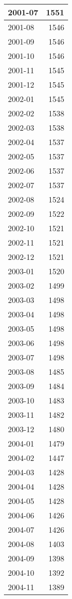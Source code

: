 \documentclass[
]{article}
\begin{document}
\begin{table}[H]
\begin{tabular}{l|r}
\hline
2001-07 & 1551\\
\hline
2001-08 & 1546\\
\hline
2001-09 & 1546\\
\hline
2001-10 & 1546\\
\hline
2001-11 & 1545\\
\hline
2001-12 & 1545\\
\hline
2002-01 & 1545\\
\hline
2002-02 & 1538\\
\hline
2002-03 & 1538\\
\hline
2002-04 & 1537\\
\hline
2002-05 & 1537\\
\hline
2002-06 & 1537\\
\hline
2002-07 & 1537\\
\hline
2002-08 & 1524\\
\hline
2002-09 & 1522\\
\hline
2002-10 & 1521\\
\hline
2002-11 & 1521\\
\hline
2002-12 & 1521\\
\hline
2003-01 & 1520\\
\hline
2003-02 & 1499\\
\hline
2003-03 & 1498\\
\hline
2003-04 & 1498\\
\hline
2003-05 & 1498\\
\hline
2003-06 & 1498\\
\hline
2003-07 & 1498\\
\hline
2003-08 & 1485\\
\hline
2003-09 & 1484\\
\hline
2003-10 & 1483\\
\hline
2003-11 & 1482\\
\hline
2003-12 & 1480\\
\hline
2004-01 & 1479\\
\hline
2004-02 & 1447\\
\hline
2004-03 & 1428\\
\hline
2004-04 & 1428\\
\hline
2004-05 & 1428\\
\hline
2004-06 & 1426\\
\hline
2004-07 & 1426\\
\hline
2004-08 & 1403\\
\hline
2004-09 & 1398\\
\hline
2004-10 & 1392\\
\hline
2004-11 & 1389\\

\end{tabular}
\end{table}
\end{document}
